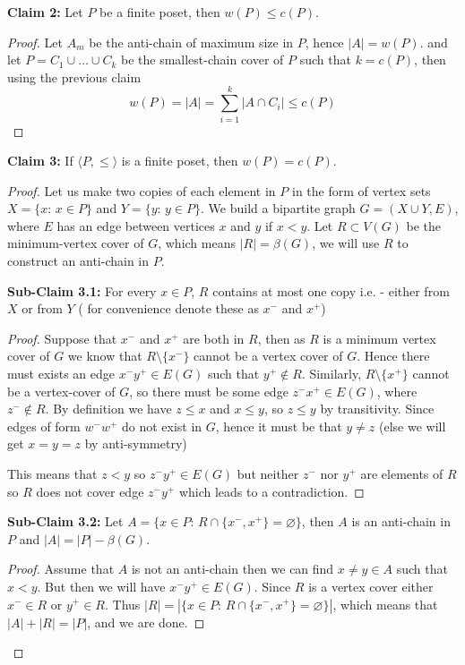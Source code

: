 \documentclass{article}
\numberwithin{equation}{section}
\newcommand{\card}[1]{\left|#1\right|}
\begin{document}
\noindent \textbf{Claim 2:} Let $P$ be a finite poset, then $w(P) \le c(P)$. 
\begin{proof}
    Let $A_m$ be the anti-chain of maximum size in $P$, hence $\card{A} = w(P)$. and let $P = C_1\cup \dots\cup C_k$ be the smallest-chain cover of $P$ such that $k = c(P)$, then using the previous claim
    \begin{equation}
        \label{e1}
        w(P) = |A| = \sum_{i=1}^{k} \card{A \cap C_i} \le c(P)
    \end{equation}
\end{proof}
\noindent \textbf{Claim 3:} If $\langle P, \leq\rangle$ is a finite poset, then $w(P) = c(P)$.
\begin{proof}
    Let us make two copies of each element in $P$ in the form of vertex sets $X=\{x: \, x\in P\}$ and $Y=\{y: \, y \in P\}$. We build a bipartite graph $G = (X\cup Y, E)$, where $E$ has an edge between vertices $x$ and $y$ if $x < y$. Let $R\subset V(G)$ be the minimum-vertex cover of $G$, which means $\card{R} = \beta(G)$, we will use $R$ to construct an anti-chain in $P$.

    \noindent \textbf{Sub-Claim 3.1:} For every $x \in P$, $R$ contains at most one copy i.e. - either from $X$ or from $Y$ ( for convenience denote these as $x^-$  and $x^+$) 
    \begin{proof}
        Suppose that $x^-$ and $x^+$ are both in $R$, then as $R$ is a minimum vertex cover of $G$ we know that $R\setminus\{x^-\}$ cannot be a vertex cover of $G$. Hence there must exists an edge $x^-y^+ \in E(G)$ such that $y^+\notin R$. Similarly, $R\setminus\{x^+\}$ cannot be a vertex-cover of $G$, so there must be some edge $z^-x^+ \in E(G)$, where $z^- \notin R$. By definition we have $z \le x$ and $x \le y$, so $z \le y$ by transitivity. Since edges of form $w^-w^+$ do not exist in $G$, hence it must be that $y\not= z$ (else we will get $x = y = z$ by anti-symmetry)

        This means that $z < y$ so $z^-y^+ \in E(G)$ but neither $z^-$ nor $y^+$ are elements of $R$ so $R$ does not cover edge $z^-y^+$ which leads to a contradiction. 
    \end{proof}

    \noindent \textbf{Sub-Claim 3.2:} Let $A = \{x \in P : \, R \cap \{x^-, x^+\} = \varnothing\}$, then $A$ is an anti-chain in $P$ and $\card{A} = \card{P} - \beta(G)$. 
    \begin{proof}
        Assume that $A$ is not an anti-chain then we can find $x\not=y \in A$ such that $x < y.$ But then we will have $x^-y^+ \in E(G)$. Since $R$ is a vertex cover either $x^- \in R$ or $y^+ \in R$. Thus $\card{R} = \card{\{x \in P : \, R \cap \{x^-, x^+\} = \varnothing\}}$, which means that $\card{A} + \card{R} = \card{P}$, and we are done. 
    \end{proof}


\end{proof}
\end{document}
